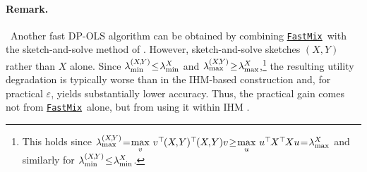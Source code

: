 \documentclass[11pt]{article}
\theoremstyle{definition}
\theoremstyle{plain}
\newcommand{\eps}{{\varepsilon}}
\renewcommand{\eps}{\varepsilon}
\newcommand{\FastMix}{\hyperref[alg:fast_mixing]{\texttt{FastMix}}\xspace}
\begin{document}
\vspace{-1.0em}
\paragraph{Remark.} \ Another fast DP-OLS algorithm can be obtained by combining \FastMix\ with the sketch-and-solve method of \citet{sheffet2017differentially}. However, sketch-and-solve sketches $(X,Y)$ rather than $X$ alone. Since $\lambda_{\min}^{(X\hspace{-0.1em},\hspace{-0.1em}Y)} \hspace{-0.2em}\leq\hspace{-0.2em} \lambda_{\min}^{X}$ and $\lambda_{\max}^{(X\hspace{-0.1em},\hspace{-0.1em}Y)} \hspace{-0.2em}\geq\hspace{-0.2em} \lambda_{\max}^{X}$,\footnote{This holds since $\lambda_{\max}^{(X\hspace{-0.1em},\hspace{-0.1em}Y)} \hspace{-0.2em}=\hspace{-0.2em} \underset{v}{\max} \ v^{\top}\hspace{-0.1em}(X\hspace{-0.1em},\hspace{-0.1em}Y)^{\top}\hspace{-0.1em}(X\hspace{-0.1em},\hspace{-0.1em}Y)v \hspace{-0.2em}\geq\hspace{-0.2em} \underset{u}{\max} \ u^{\top}\hspace{-0.1em}X^{\top}\hspace{-0.1em}Xu \hspace{-0.2em}=\hspace{-0.2em} \lambda^{X}_{\max}$ and similarly for $\lambda_{\min}^{(X\hspace{-0.1em},\hspace{-0.1em}Y)} \hspace{-0.2em}\leq\hspace{-0.2em} \lambda_{\min}^{X}$.} the resulting utility degradation is typically worse than in the IHM-based construction and, for practical $\eps$, yields substantially lower accuracy. Thus, the practical gain comes not from \FastMix\ alone, but from using it within IHM \citep{lev2026near}.
\end{document}
